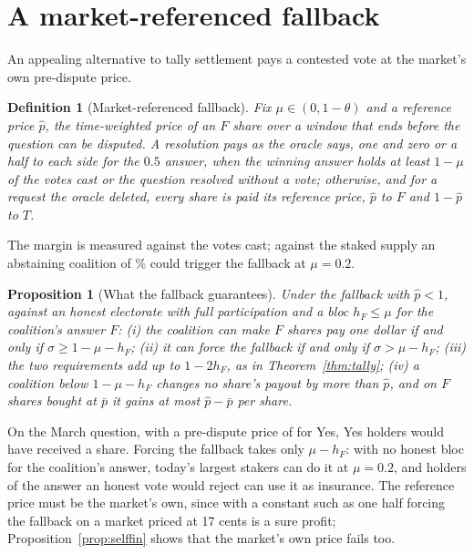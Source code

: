 \documentclass[conference,compsoc]{IEEEtran}
\newtheorem{proposition}{Proposition}
\newtheorem{definition}{Definition}
\newcommand{\muparam}{\mu}
\newcommand{\hF}{h_{F}}
\newcommand{\phat}{\hat{p}}
\begin{document}
\section{A market-referenced fallback}
\label{app:tape}
 An appealing alternative to tally settlement pays a contested vote at the market's own pre-dispute price.

\begin{definition}[Market-referenced fallback]
 Fix $\muparam \in (0, 1 - \theta)$ and a reference price $\phat$, the time-weighted price of an $F$ share over a window that ends before the question can be disputed. A resolution pays as the oracle says, one and zero or a half to each side for the $0.5$ answer, when the winning answer holds at least $1 - \muparam$ of the votes cast or the question resolved without a vote; otherwise, and for a request the oracle deleted, every share is paid its reference price, $\phat$ to $F$ and $1 - \phat$ to $T$.
\end{definition}
 The margin is measured against the votes cast; against the staked supply an abstaining coalition of \stakedTriggerForcePct\% could trigger the fallback at $\muparam = 0.2$.

\begin{proposition}[What the fallback guarantees]
\label{thm:fallback}
 Under the fallback with $\phat < 1$, against an honest electorate with full participation and a bloc $\hF \le \muparam$ for the coalition's answer $F$: (i) the coalition can make $F$ shares pay one dollar if and only if $\sigma \ge 1 - \muparam - \hF$; (ii) it can force the fallback if and only if $\sigma > \muparam - \hF$; (iii) the two requirements add up to $1 - 2\hF$, as in Theorem~\ref{thm:tally}; (iv) a coalition below $1 - \muparam - \hF$ changes no share's payout by more than $\phat$, and on $F$ shares bought at $\bar p$ it gains at most $\phat - \bar p$ per share.
\end{proposition}
 On the March question, with a pre-dispute price of \marchTwap{} for Yes, Yes holders would have received \marchTwap{} a share. Forcing the fallback takes only $\muparam - \hF$: with no honest bloc for the coalition's answer, today's \tapeForceStakersTwentyWord{} largest stakers can do it at $\muparam = 0.2$, and holders of the answer an honest vote would reject can use it as insurance. The reference price must be the market's own, since with a constant such as one half forcing the fallback on a market priced at 17 cents is a sure profit; Proposition~\ref{prop:selffin} shows that the market's own price fails too.
\end{document}
